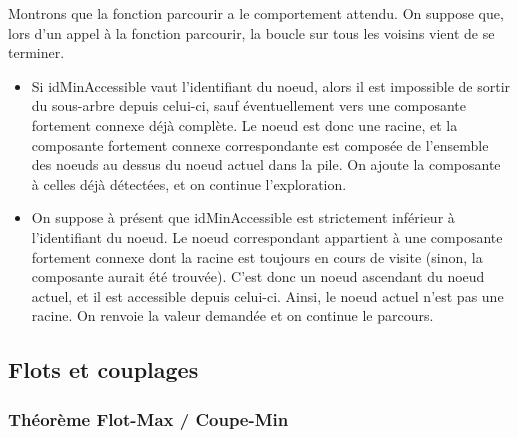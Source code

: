 \documentclass[11pt,a4paper]{article}
\begin{document}
Montrons que la fonction parcourir a le comportement attendu. On suppose que, lors d'un appel à la fonction parcourir, la boucle sur tous les voisins vient de se terminer.
\begin{itemize}
  \item Si idMinAccessible vaut l'identifiant du noeud, alors il est impossible de sortir du sous-arbre depuis celui-ci, sauf éventuellement vers une composante fortement connexe déjà complète. Le noeud est donc une racine, et la composante fortement connexe correspondante est composée de l'ensemble des noeuds au dessus du noeud actuel dans la pile. On ajoute la composante à celles déjà détectées, et on continue l'exploration.
  \item On suppose à présent que idMinAccessible est strictement inférieur à l'identifiant du noeud. Le noeud correspondant appartient à une composante fortement connexe dont la racine est toujours en cours de visite (sinon, la composante aurait été trouvée). C'est donc un noeud ascendant du noeud actuel, et il est accessible depuis celui-ci. Ainsi, le noeud actuel n'est pas une racine. On renvoie la valeur demandée et on continue le parcours.



\end{itemize}


  \subsection{Flots et couplages}

    \subsubsection{Théorème Flot-Max / Coupe-Min}
\end{document}
